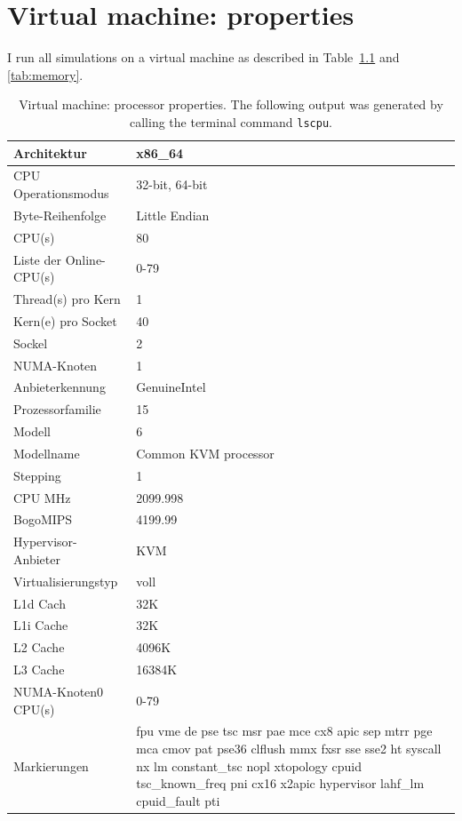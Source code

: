 \clearpage


\chapter{Virtual machine: properties}
\label{sec:VirtualMachine}
I run all simulations on a virtual machine as described in Table~\ref{tab:lscpu} and \ref{tab:memory}.

\begin{table}[hbt!]
\begin{footnotesize}
\begin{tabular}{|p{4cm}|p{10cm}|}
 \hline
Architektur&              x86\_64 \\ \hline
CPU Operationsmodus&     32-bit, 64-bit \\  \hline
Byte-Reihenfolge&        Little Endian \\  \hline
CPU(s)&                  80 \\   \hline
Liste der Online-CPU(s)& 0-79 \\  \hline
Thread(s) pro Kern&      1 \\  \hline
Kern(e) pro Socket&     40 \\  \hline
Sockel&                  2 \\  \hline
NUMA-Knoten&             1 \\  \hline
Anbieterkennung&         GenuineIntel \\  \hline
Prozessorfamilie&        15 \\  \hline
Modell&                  6 \\  \hline
Modellname&              Common KVM processor \\  \hline
Stepping&                1 \\  \hline
CPU MHz&                 2099.998 \\  \hline
BogoMIPS&                4199.99 \\  \hline
Hypervisor-Anbieter&     KVM \\  \hline
Virtualisierungstyp&     voll \\  \hline
L1d Cach&               32K \\  \hline
L1i Cache&               32K \\  \hline
L2 Cache&               4096K \\  \hline
L3 Cache&                16384K \\  \hline
NUMA-Knoten0 CPU(s)&     0-79\\  \hline
Markierungen&           fpu vme de pse tsc msr pae mce cx8 apic sep mtrr pge mca cmov pat pse36 clflush mmx fxsr sse sse2 ht syscall nx lm constant\_tsc nopl xtopology cpuid tsc\_known\_freq pni cx16 x2apic hypervisor lahf\_lm cpuid\_fault pti \\ 
 \hline
\end{tabular} 
\end{footnotesize}
\caption{Virtual machine: processor properties. The following output was generated by calling the terminal command \lstinline{lscpu}\textit{}.}
\label{tab:lscpu}
\end{table}

